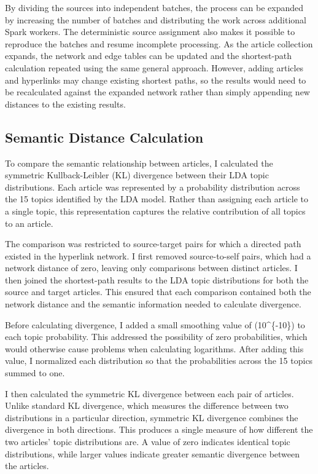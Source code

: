 \documentclass[
  letterpaper,
  DIV=11,
  numbers=noendperiod]{scrartcl}
\begin{document}
By dividing the sources into independent batches, the process can be
expanded by increasing the number of batches and distributing the work
across additional Spark workers. The deterministic source assignment
also makes it possible to reproduce the batches and resume incomplete
processing. As the article collection expands, the network and edge
tables can be updated and the shortest-path calculation repeated using
the same general approach. However, adding articles and hyperlinks may
change existing shortest paths, so the results would need to be
recalculated against the expanded network rather than simply appending
new distances to the existing results.

\subsection{Semantic Distance
Calculation}\label{semantic-distance-calculation}

To compare the semantic relationship between articles, I calculated the
symmetric Kullback-Leibler (KL) divergence between their LDA topic
distributions. Each article was represented by a probability
distribution across the 15 topics identified by the LDA model. Rather
than assigning each article to a single topic, this representation
captures the relative contribution of all topics to an article.

The comparison was restricted to source-target pairs for which a
directed path existed in the hyperlink network. I first removed
source-to-self pairs, which had a network distance of zero, leaving only
comparisons between distinct articles. I then joined the shortest-path
results to the LDA topic distributions for both the source and target
articles. This ensured that each comparison contained both the network
distance and the semantic information needed to calculate divergence.

Before calculating divergence, I added a small smoothing value of
(10\^{}\{-10\}) to each topic probability. This addressed the
possibility of zero probabilities, which would otherwise cause problems
when calculating logarithms. After adding this value, I normalized each
distribution so that the probabilities across the 15 topics summed to
one.

I then calculated the symmetric KL divergence between each pair of
articles. Unlike standard KL divergence, which measures the difference
between two distributions in a particular direction, symmetric KL
divergence combines the divergence in both directions. This produces a
single measure of how different the two articles' topic distributions
are. A value of zero indicates identical topic distributions, while
larger values indicate greater semantic divergence between the articles.
\end{document}
